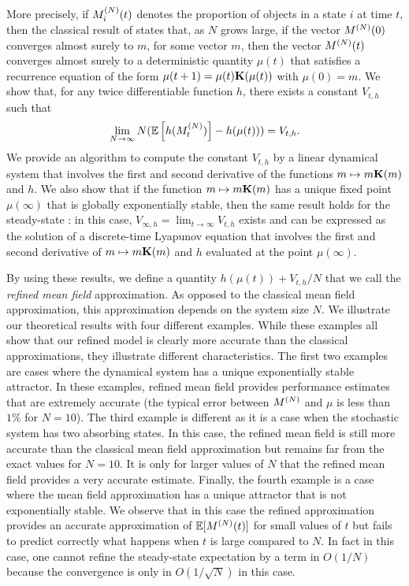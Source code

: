 \documentclass[review]{elsarticle}
\begin{document}
More precisely, if $M^{(N)}_i(t)$ denotes the proportion of objects in a
state $i$ at time $t$, then the classical result of \cite{Le+07}
states that, as $N$ grows large, if the vector $M^{(N)}(0)$ converges almost surely
to $m$, for some vector $m$, then the vector $M^{(N)}(t)$ converges almost
surely to a deterministic quantity $\mu(t)$ that satisfies a
recurrence equation of the form $\mu(t+1)=\mu(t)\mathbf{K}(\mu(t))$ with
$\mu(0)=m$. We show that, for any twice differentiable function $h$, there
exists a constant $V_{t,h}$ such that
\begin{align}
  \label{eq:main_result}
  \lim_{N\to\infty} N(\esp{h(\MN_t)} - h(\mu(t))) = V_{t,h}.
\end{align}
We provide an algorithm to compute the constant $V_{t,h}$ by a linear
dynamical system that involves the first and second derivative of the
functions $m\mapsto m\mathbf{K}(m)$ and $h$.  We also show that if the function
$m\mapsto m\mathbf{K}(m)$ has a unique fixed point $\mu(\infty)$ that is
globally exponentially stable, then the same result holds for the
steady-state : in this case, $V_{\infty,h}=\lim_{t\to\infty}V_{t,h}$
exists and can be expressed as the solution of a discrete-time
Lyapunov equation that involves the first and second derivative of
$m\mapsto m\mathbf{K}(m)$ and $h$ evaluated at the point $\mu(\infty)$.

By using these results, we define a quantity $h(\mu(t))+V_{t,h}/N$
that we call the \emph{refined mean field} approximation. As opposed
to the classical mean field approximation, this approximation depends
on the system size $N$. We illustrate our theoretical results with
four different examples. While these examples all show that our
refined model is clearly more accurate than the classical
approximations, they illustrate different characteristics. The first
two examples are cases where the dynamical system has a unique
exponentially stable attractor. In these examples, refined mean field
provides performance estimates that are extremely accurate (the
typical error between $M^{(N)}$ and $\mu$ is less than $1\%$ for
$N=10$). The third example is different as it is a case when the
stochastic system has two absorbing states. In this case, the refined
mean field is still more accurate than the classical mean field
approximation but remains far from the exact values for $N=10$.  It is
only for larger values of $N$ that the refined mean field provides a
very accurate estimate. Finally, the fourth example is a case where
the mean field approximation has a unique attractor that is not
exponentially stable. We observe that in this case the refined
approximation provides an accurate approximation of $\esp{\MN(t)}$ for
small values of $t$ but fails to predict correctly what happens when
$t$ is large compared to $N$. In fact in this case, one cannot refine
the steady-state expectation by a term in $O(1/N)$ because the
convergence is only in $O(1/\sqrt{N})$ in this case.
\end{document}
